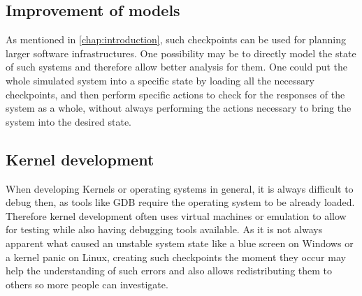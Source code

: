 \subsection{Improvement of models}
As mentioned in \autoref{chap:introduction},
such checkpoints can be used for planning larger software infrastructures.
One possibility may be to directly model the state of such systems
and therefore allow better analysis for them.
One could put the whole simulated system into a specific state by loading all the necessary checkpoints,
and then perform specific actions to check for the responses of the system as a whole,
without always performing the actions necessary to bring the system into the desired state.

\subsection{Kernel development}
When developing Kernels or operating systems in general,
it is always difficult to debug then, as tools like GDB require the operating system to be already loaded.
Therefore kernel development often uses virtual machines or emulation
to allow for testing while also having debugging tools available.
As it is not always apparent what caused an unstable system state
like a blue screen on Windows or a kernel panic on Linux,
creating such checkpoints the moment they occur may help the understanding of such errors
and also allows redistributing them to others so more people can investigate.
